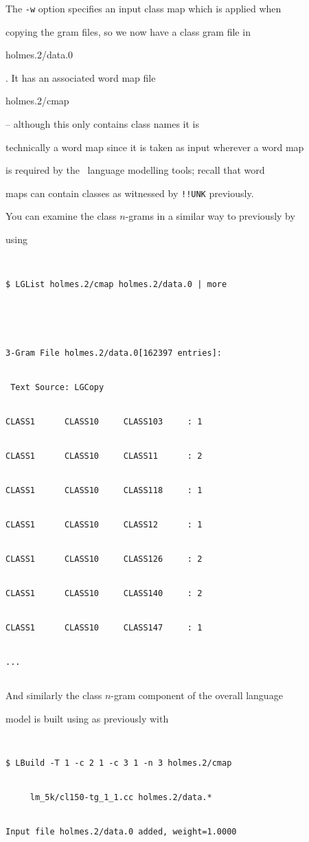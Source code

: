 The {\tt -w} option specifies an input class map which is applied when


copying the gram files, so we now have a class gram file in {\tt


holmes.2/data.0}.  It has an associated word map file {\tt


holmes.2/cmap} -- although this only contains class names it is


technically a word map since it is taken as input wherever a word map


is required by the \HTK\ language modelling tools; recall that word


maps can contain classes as witnessed by {\tt !!UNK} previously.





You can examine the class $n$-grams in a similar way to previously by


using 


\begin{verbatim}


$ LGList holmes.2/cmap holmes.2/data.0 | more 


 


3-Gram File holmes.2/data.0[162397 entries]:


 Text Source: LGCopy


CLASS1      CLASS10     CLASS103     : 1


CLASS1      CLASS10     CLASS11      : 2


CLASS1      CLASS10     CLASS118     : 1


CLASS1      CLASS10     CLASS12      : 1


CLASS1      CLASS10     CLASS126     : 2


CLASS1      CLASS10     CLASS140     : 2


CLASS1      CLASS10     CLASS147     : 1


...


\end{verbatim} %





And similarly the class $n$-gram component of the overall language


model is built using  as previously with


\begin{verbatim}


$ LBuild -T 1 -c 2 1 -c 3 1 -n 3 holmes.2/cmap


     lm_5k/cl150-tg_1_1.cc holmes.2/data.*


Input file holmes.2/data.0 added, weight=1.0000


\end{verbatim} %





